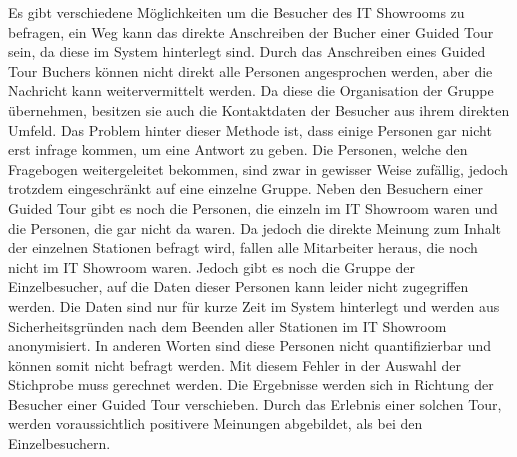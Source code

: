 Es gibt verschiedene Möglichkeiten um die Besucher des IT Showrooms zu befragen, ein Weg kann das direkte Anschreiben der Bucher einer Guided Tour sein, da diese im System hinterlegt sind.
Durch das Anschreiben eines Guided Tour Buchers können nicht direkt alle Personen angesprochen werden, aber die Nachricht kann weitervermittelt werden. 
Da diese die Organisation der Gruppe übernehmen, besitzen sie auch die Kontaktdaten der Besucher aus ihrem direkten Umfeld.
Das Problem hinter dieser Methode ist, dass einige Personen gar nicht erst infrage kommen, um eine Antwort zu geben. 
Die Personen, welche den Fragebogen weitergeleitet bekommen, sind zwar in gewisser Weise zufällig, jedoch trotzdem eingeschränkt auf eine einzelne Gruppe.  
Neben den Besuchern einer Guided Tour gibt es noch die Personen, die einzeln im IT Showroom waren und die Personen, die gar nicht da waren. 
Da jedoch die direkte Meinung zum Inhalt der einzelnen Stationen befragt wird, fallen alle Mitarbeiter heraus, die noch nicht im IT Showroom waren. 
Jedoch gibt es noch die Gruppe der Einzelbesucher, auf die Daten dieser Personen kann leider nicht zugegriffen werden. 
Die Daten sind nur für kurze Zeit im System hinterlegt und werden aus Sicherheitsgründen nach dem Beenden aller Stationen im IT Showroom anonymisiert. 
In anderen Worten sind diese Personen nicht quantifizierbar und können somit nicht befragt werden.
Mit diesem Fehler in der Auswahl der Stichprobe muss gerechnet werden. 
Die Ergebnisse werden sich in Richtung der Besucher einer Guided Tour verschieben. 
Durch das Erlebnis einer solchen Tour, werden voraussichtlich positivere Meinungen abgebildet, als bei den Einzelbesuchern.

